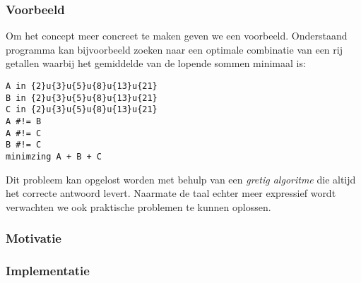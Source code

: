 \subsubsection{Voorbeeld}

Om het concept meer concreet te maken geven we een voorbeeld. Onderstaand programma kan bijvoorbeeld zoeken naar een optimale combinatie van een rij getallen waarbij het gemiddelde van de lopende sommen minimaal is:

\begin{verbatim}
A in {2}u{3}u{5}u{8}u{13}u{21}
B in {2}u{3}u{5}u{8}u{13}u{21}
C in {2}u{3}u{5}u{8}u{13}u{21}
A #!= B
A #!= C
B #!= C
minimzing A + B + C
\end{verbatim}
Dit probleem kan opgelost worden met behulp van een \emph{gretig algoritme} die altijd het correcte antwoord levert. Naarmate de taal echter meer expressief wordt verwachten we ook praktische problemen te kunnen oplossen.

\subsubsection{Motivatie}

\subsubsection{Implementatie}
